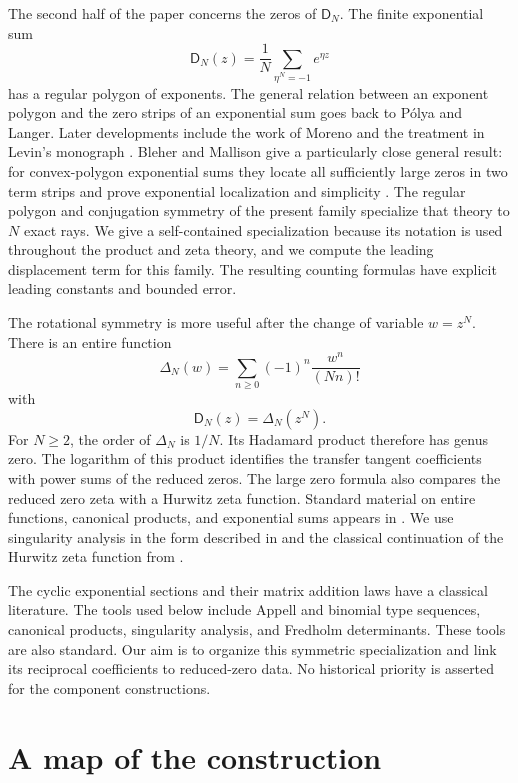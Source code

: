 \documentclass[11pt,letterpaper]{article}
\theoremstyle{definition}
\theoremstyle{remark}
\newcommand{\Dfun}{\mathsf D}
\begin{document}
The second half of the paper concerns the zeros of $\Dfun_N$.  The finite exponential sum
\[
\Dfun_N(z)=\frac1N\sum_{\eta^N=-1}e^{\eta z}
\]
has a regular polygon of exponents.  The general relation between an exponent polygon and the zero strips of an exponential sum goes back to P\'olya and Langer.  Later developments include the work of Moreno and the treatment in Levin's monograph \cite{Polya1920,Langer1931,Moreno1973,Levin1980}. Bleher and Mallison give a particularly close general result: for convex-polygon exponential sums they locate all sufficiently large zeros in two term strips and prove exponential localization and simplicity \cite{BleherMallison2006}. The regular polygon and conjugation symmetry of the present family specialize that theory to $N$ exact rays. We give a self-contained specialization because its notation is used throughout the product and zeta theory, and we compute the leading displacement term for this family. The resulting counting formulas have explicit leading constants and bounded error.

The rotational symmetry is more useful after the change of variable $w=z^N$.  There is an entire function
\[
\Delta_N(w)=\sum_{n\geq 0}(-1)^n\frac{w^n}{(Nn)!}
\]
with
\[
\Dfun_N(z)=\Delta_N(z^N).
\]
For $N\geq2$, the order of $\Delta_N$ is $1/N$.  Its Hadamard product therefore has genus zero.  The logarithm of this product identifies the transfer tangent coefficients with power sums of the reduced zeros.  The large zero formula also compares the reduced zero zeta with a Hurwitz zeta function.  Standard material on entire functions, canonical products, and exponential sums appears in \cite{Boas1954,Levin1980,Titchmarsh1939}.  We use singularity analysis in the form described in \cite{FlajoletSedgewick2009} and the classical continuation of the Hurwitz zeta function from \cite{Apostol1976}.

The cyclic exponential sections and their matrix addition laws have a
classical literature. The tools used below include Appell and binomial type
sequences, canonical products, singularity analysis, and Fredholm
determinants. These tools are also standard. Our aim is to organize this symmetric
specialization and link its reciprocal coefficients to reduced-zero data. No
historical priority is asserted for the component constructions.



\section{A map of the construction}\label{sec:map}
\end{document}
